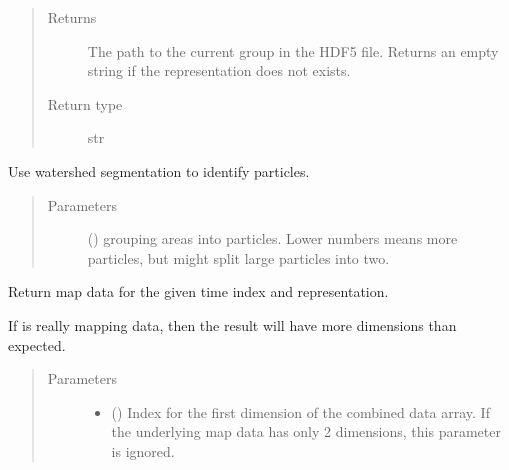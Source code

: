 \documentclass[letterpaper,10pt,english]{sphinxmanual}
\begin{document}
\begin{fulllineitems}
\begin{fulllineitems}
\begin{quote}
\begin{description}
\item[{Returns}] \leavevmode
{} \textendash{} The path to the current group in the HDF5 file. Returns an
empty string if the representation does not exists.

\item[{Return type}] \leavevmode
str

\end{description}\end{quote}

\end{fulllineitems}


\begin{fulllineitems}
\label{\detokenize{xanespy:xanespy.xanes_frameset.XanesFrameset.label_particles}}
Use watershed segmentation to identify particles.
\begin{quote}\begin{description}
\item[{Parameters}] \leavevmode
{} (\sphinxstyleliteralemphasis{-}) \textendash{} grouping areas into particles. Lower numbers means more
particles, but might split large particles into two.

\end{description}\end{quote}

\end{fulllineitems}


\begin{fulllineitems}
\label{\detokenize{xanespy:xanespy.xanes_frameset.XanesFrameset.map_data}}
Return map data for the given time index and representation.

If  is really mapping data, then the result
will have more dimensions than expected.
\begin{quote}\begin{description}
\item[{Parameters}] \leavevmode\begin{itemize}
\item {} 
 () \textendash{} Index for the first dimension of the combined data array. If
the underlying map data has only 2 dimensions, this
parameter is ignored.


\end{itemize}
\end{description}
\end{quote}
\end{fulllineitems}
\end{fulllineitems}
\end{document}
